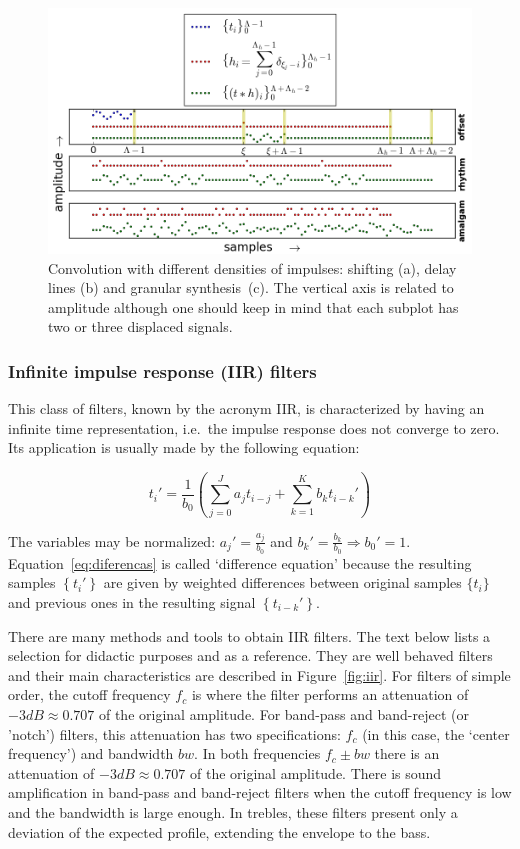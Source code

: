 \begin{figure}
    \centering
        \includegraphics[width=\textwidth]{figures/delays_}
    \caption{Convolution with different densities of impulses: shifting (a), delay lines (b) and granular synthesis~(c).
    The vertical axis is related to amplitude although one should keep in mind that each subplot has two or three displaced signals.}
        \label{fig:delays}
\end{figure}

\subsubsection{Infinite impulse response (IIR) filters}
This class of filters, known by the acronym IIR, is characterized by having an infinite time representation, i.e.\ the impulse response does not converge to zero. Its application is usually made by the following equation:

\begin{equation}\label{eq:diferencas}
 t_i' = \frac{1}{b_0}\left ( \sum_{j=0}^Ja_j t_{i-j} + \sum_{k=1}^Kb_k t_{i-k}' \right )
\end{equation}

The variables may be normalized: $a_j'=\frac{a_j}{b_0}$ and $b_k'=\frac{b_k}{b_0} \Rightarrow b_0' = 1$.
Equation~\ref{eq:diferencas} is called `difference equation' because the resulting samples 
$\left\{t_i'\right\}$ are given by weighted differences between original samples $\{t_i\}$ 
and previous ones in the resulting signal $\left\{t_{i-k}'\right\}$.

There are many methods and tools to obtain IIR filters. The text below lists a selection for didactic purposes and as a reference. They are well behaved filters and their main characteristics are described in Figure~\ref{fig:iir}. For filters of simple order, the cutoff frequency $f_c$ is where the filter performs an attenuation of $-3dB \approx 0.707 $ of the original amplitude.
For band-pass and band-reject (or 'notch') filters, this attenuation has two specifications: $f_c$ (in this case, the `center frequency') and bandwidth $bw$. In both frequencies $f_c \pm bw$ there is an attenuation of $-3dB \approx 0.707$ of the original amplitude.
There is sound amplification in band-pass and band-reject filters when the cutoff frequency is low and the bandwidth is large enough. In trebles, these filters present only a deviation of the expected profile, extending the envelope to the bass.

